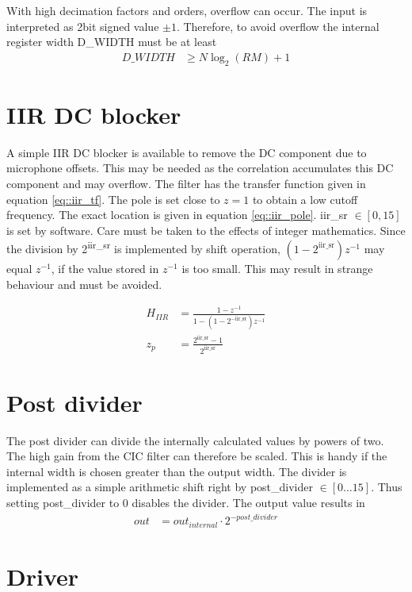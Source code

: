 With high decimation factors and orders, overflow can occur.
The input is interpreted as 2bit signed value $\pm1$. 
Therefore, to avoid overflow the internal register width D\_WIDTH must be at least
\begin{align}
D\_WIDTH &\ge N\log_2{(RM)} + 1 \label{eq::cic_width}
\end{align}

\section{IIR DC blocker}
\label{sec::iir}
A simple IIR DC blocker is available to remove the DC component due to microphone offsets.
This may be needed as the correlation accumulates this DC component and may overflow.
The filter has the transfer function given in equation \ref{eq::iir_tf}.
The pole is set close to $z=1$ to obtain a low cutoff frequency.
The exact location is given in equation \ref{eq::iir_pole}.
iir\_sr $\in\left[0,15\right]$ is set by software.
Care must be taken to the effects of integer mathematics.
Since the division by 2\textsuperscript{iir\_sr} is implemented by shift operation, $(1-2^\text{iir\_sr})z^{-1}$ may equal $z^{-1}$, if the value stored in $z^{-1}$ is too small.
This may result in strange behaviour and must be avoided.

\begin{align}
	H_{IIR} &= \frac{1-z^{-1}}{1-\left(1-2^{-\text{iir\_sr}}\right)z^{-1}} \label{eq::iir_tf}\\
	z_p &= \frac{2^{\text{iir\_sr}}-1}{2^{\text{iir\_sr}}} \label{eq::iir_pole}
\end{align}

\section{Post divider}
\label{sec::post_divider}

The post divider can divide the internally calculated values by powers of two.
The high gain from the CIC filter can therefore be scaled.
This is handy if the internal width is chosen greater than the output width.
The divider is implemented as a simple arithmetic shift right by post\_divider $\in\left[0\ldots15\right]$.
Thus setting post\_divider to 0 disables the divider.
The output value results in
\begin{align}
	out &= out_{internal}\cdot2^{-post\_divider}
\end{align}

\section{Driver}
\label{sec::driver}

